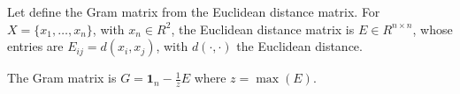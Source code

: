 Let define the Gram matrix from the Euclidean distance matrix. For $X = \{ x_1, \ldots, x_n \}$, with $x_n \in R^2$, the Euclidean distance matrix is $E \in R^{n\times n}$, whose entries are $E_{ij} = d(x_i, x_j)$, with $d(\cdot, \cdot)$ the Euclidean distance.

The Gram matrix is $G = \mathbf{1}_n - \frac{1}{z}E$ where $z=\operatorname{max}(E)$.